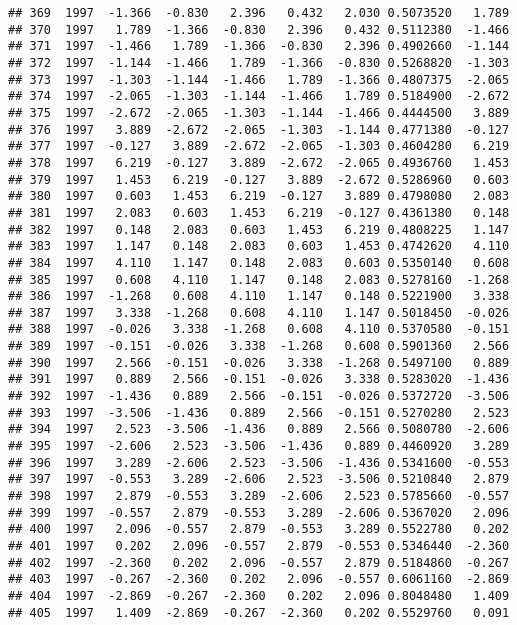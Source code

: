 \documentclass[]{article}
\begin{document}
\begin{verbatim}
## 369  1997  -1.366  -0.830   2.396   0.432   2.030 0.5073520   1.789
## 370  1997   1.789  -1.366  -0.830   2.396   0.432 0.5112380  -1.466
## 371  1997  -1.466   1.789  -1.366  -0.830   2.396 0.4902660  -1.144
## 372  1997  -1.144  -1.466   1.789  -1.366  -0.830 0.5268820  -1.303
## 373  1997  -1.303  -1.144  -1.466   1.789  -1.366 0.4807375  -2.065
## 374  1997  -2.065  -1.303  -1.144  -1.466   1.789 0.5184900  -2.672
## 375  1997  -2.672  -2.065  -1.303  -1.144  -1.466 0.4444500   3.889
## 376  1997   3.889  -2.672  -2.065  -1.303  -1.144 0.4771380  -0.127
## 377  1997  -0.127   3.889  -2.672  -2.065  -1.303 0.4604280   6.219
## 378  1997   6.219  -0.127   3.889  -2.672  -2.065 0.4936760   1.453
## 379  1997   1.453   6.219  -0.127   3.889  -2.672 0.5286960   0.603
## 380  1997   0.603   1.453   6.219  -0.127   3.889 0.4798080   2.083
## 381  1997   2.083   0.603   1.453   6.219  -0.127 0.4361380   0.148
## 382  1997   0.148   2.083   0.603   1.453   6.219 0.4808225   1.147
## 383  1997   1.147   0.148   2.083   0.603   1.453 0.4742620   4.110
## 384  1997   4.110   1.147   0.148   2.083   0.603 0.5350140   0.608
## 385  1997   0.608   4.110   1.147   0.148   2.083 0.5278160  -1.268
## 386  1997  -1.268   0.608   4.110   1.147   0.148 0.5221900   3.338
## 387  1997   3.338  -1.268   0.608   4.110   1.147 0.5018450  -0.026
## 388  1997  -0.026   3.338  -1.268   0.608   4.110 0.5370580  -0.151
## 389  1997  -0.151  -0.026   3.338  -1.268   0.608 0.5901360   2.566
## 390  1997   2.566  -0.151  -0.026   3.338  -1.268 0.5497100   0.889
## 391  1997   0.889   2.566  -0.151  -0.026   3.338 0.5283020  -1.436
## 392  1997  -1.436   0.889   2.566  -0.151  -0.026 0.5372720  -3.506
## 393  1997  -3.506  -1.436   0.889   2.566  -0.151 0.5270280   2.523
## 394  1997   2.523  -3.506  -1.436   0.889   2.566 0.5080780  -2.606
## 395  1997  -2.606   2.523  -3.506  -1.436   0.889 0.4460920   3.289
## 396  1997   3.289  -2.606   2.523  -3.506  -1.436 0.5341600  -0.553
## 397  1997  -0.553   3.289  -2.606   2.523  -3.506 0.5210840   2.879
## 398  1997   2.879  -0.553   3.289  -2.606   2.523 0.5785660  -0.557
## 399  1997  -0.557   2.879  -0.553   3.289  -2.606 0.5367020   2.096
## 400  1997   2.096  -0.557   2.879  -0.553   3.289 0.5522780   0.202
## 401  1997   0.202   2.096  -0.557   2.879  -0.553 0.5346440  -2.360
## 402  1997  -2.360   0.202   2.096  -0.557   2.879 0.5184860  -0.267
## 403  1997  -0.267  -2.360   0.202   2.096  -0.557 0.6061160  -2.869
## 404  1997  -2.869  -0.267  -2.360   0.202   2.096 0.8048480   1.409
## 405  1997   1.409  -2.869  -0.267  -2.360   0.202 0.5529760   0.091

\end{verbatim}
\end{document}
